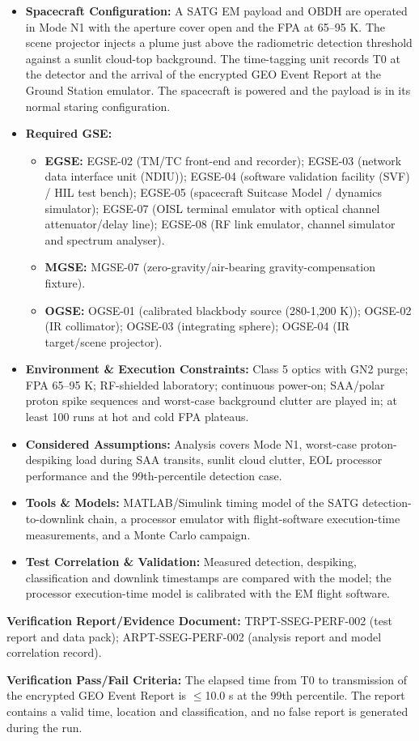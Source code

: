 \begin{itemize}
\item \textbf{Spacecraft Configuration:} A SATG EM payload and OBDH are operated in Mode N1 with the aperture cover open and the FPA at 65--95 K. The scene projector injects a plume just above the radiometric detection threshold against a sunlit cloud-top background. The time-tagging unit records T0 at the detector and the arrival of the encrypted GEO Event Report at the Ground Station emulator. The spacecraft is powered and the payload is in its normal staring configuration.
\item \textbf{Required GSE:}
\begin{itemize}
\item \textbf{EGSE:} EGSE-02 (TM/TC front-end and recorder); EGSE-03 (network data interface unit (NDIU)); EGSE-04 (software validation facility (SVF) / HIL test bench); EGSE-05 (spacecraft Suitcase Model / dynamics simulator); EGSE-07 (OISL terminal emulator with optical channel attenuator/delay line); EGSE-08 (RF link emulator, channel simulator and spectrum analyser).
\item \textbf{MGSE:} MGSE-07 (zero-gravity/air-bearing gravity-compensation fixture).
\item \textbf{OGSE:} OGSE-01 (calibrated blackbody source (280-1,200 K)); OGSE-02 (IR collimator); OGSE-03 (integrating sphere); OGSE-04 (IR target/scene projector).
\end{itemize}
\item \textbf{Environment \& Execution Constraints:} Class 5 optics with GN2 purge; FPA 65--95 K; RF-shielded laboratory; continuous power-on; SAA/polar proton spike sequences and worst-case background clutter are played in; at least 100 runs at hot and cold FPA plateaus.
\item \textbf{Considered Assumptions:} Analysis covers Mode N1, worst-case proton-despiking load during SAA transits, sunlit cloud clutter, EOL processor performance and the 99th-percentile detection case.
\item \textbf{Tools \& Models:} MATLAB/Simulink timing model of the SATG detection-to-downlink chain, a processor emulator with flight-software execution-time measurements, and a Monte Carlo campaign.
\item \textbf{Test Correlation \& Validation:} Measured detection, despiking, classification and downlink timestamps are compared with the model; the processor execution-time model is calibrated with the EM flight software.
\end{itemize}
\par\textbf{Verification Report/Evidence Document:} TRPT-SSEG-PERF-002 (test report and data pack); ARPT-SSEG-PERF-002 (analysis report and model correlation record).
\par\textbf{Verification Pass/Fail Criteria:} The elapsed time from T0 to transmission of the encrypted GEO Event Report is $\le$10.0 s at the 99th percentile. The report contains a valid time, location and classification, and no false report is generated during the run.
\par\medskip
